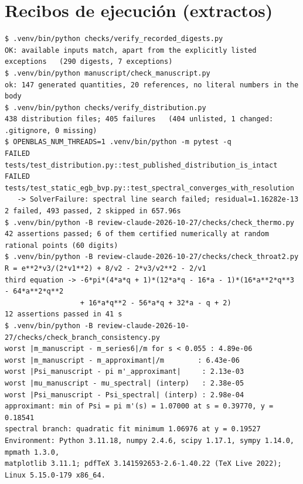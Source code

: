 \documentclass[10pt,a4paper]{article}
\begin{document}
\section{Recibos de ejecución (extractos)}
\small
\begin{verbatim}
$ .venv/bin/python checks/verify_recorded_digests.py
OK: available inputs match, apart from the explicitly listed exceptions   (290 digests, 7 exceptions)
$ .venv/bin/python manuscript/check_manuscript.py
ok: 147 generated quantities, 20 references, no literal numbers in the body
$ .venv/bin/python checks/verify_distribution.py
438 distribution files; 405 failures   (404 unlisted, 1 changed: .gitignore, 0 missing)
$ OPENBLAS_NUM_THREADS=1 .venv/bin/python -m pytest -q
FAILED tests/test_distribution.py::test_published_distribution_is_intact
FAILED tests/test_static_egb_bvp.py::test_spectral_converges_with_resolution
   -> SolverFailure: spectral line search failed; residual=1.16282e-13
2 failed, 493 passed, 2 skipped in 657.96s
$ .venv/bin/python -B review-claude-2026-10-27/checks/check_thermo.py
42 assertions passed; 6 of them certified numerically at random rational points (60 digits)
$ .venv/bin/python -B review-claude-2026-10-27/checks/check_throat2.py
R = e**2*v3/(2*v1**2) + 8/v2 - 2*v3/v2**2 - 2/v1
third equation -> -6*pi*(4*a*q + 1)*(12*a*q - 16*a - 1)*(16*a**2*q**3 - 64*a**2*q**2
                  + 16*a*q**2 - 56*a*q + 32*a - q + 2)
12 assertions passed in 41 s
$ .venv/bin/python -B review-claude-2026-10-27/checks/check_branch_consistency.py
worst |m_manuscript - m_series6|/m for s < 0.055 : 4.89e-06
worst |m_manuscript - m_approximant|/m        : 6.43e-06
worst |Psi_manuscript - pi m'_approximant|     : 2.13e-03
worst |mu_manuscript - mu_spectral| (interp)   : 2.38e-05
worst |Psi_manuscript - Psi_spectral| (interp) : 2.98e-04
approximant: min of Psi = pi m'(s) = 1.07000 at s = 0.39770, y = 0.18541
spectral branch: quadratic fit minimum 1.06976 at y = 0.19527
Environment: Python 3.11.18, numpy 2.4.6, scipy 1.17.1, sympy 1.14.0, mpmath 1.3.0,
matplotlib 3.11.1; pdfTeX 3.141592653-2.6-1.40.22 (TeX Live 2022); Linux 5.15.0-179 x86_64.
\end{verbatim}
\end{document}
